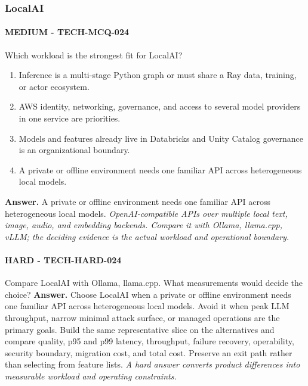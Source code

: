 \subsubsection*{LocalAI}
\paragraph{MEDIUM - TECH-MCQ-024} Which workload is the strongest fit for LocalAI?
\begin{enumerate}[label=\Alph*.]
\item Inference is a multi-stage Python graph or must share a Ray data, training, or actor ecosystem.
\item AWS identity, networking, governance, and access to several model providers in one service are priorities.
\item Models and features already live in Databricks and Unity Catalog governance is an organizational boundary.
\item A private or offline environment needs one familiar API across heterogeneous local models.
\end{enumerate}
\textbf{Answer.} A private or offline environment needs one familiar API across heterogeneous local models.
\textit{OpenAI-compatible APIs over multiple local text, image, audio, and embedding backends. Compare it with Ollama, llama.cpp, vLLM; the deciding evidence is the actual workload and operational boundary.}
\paragraph{HARD - TECH-HARD-024} Compare LocalAI with Ollama, llama.cpp. What measurements would decide the choice?
\textbf{Answer.} Choose LocalAI when a private or offline environment needs one familiar API across heterogeneous local models. Avoid it when peak LLM throughput, narrow minimal attack surface, or managed operations are the primary goals. Build the same representative slice on the alternatives and compare quality, p95 and p99 latency, throughput, failure recovery, operability, security boundary, migration cost, and total cost. Preserve an exit path rather than selecting from feature lists.
\textit{A hard answer converts product differences into measurable workload and operating constraints.}
